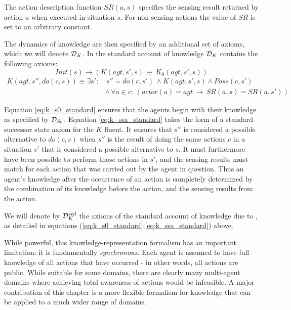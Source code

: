 The action description function $SR(a,s)$ specifies the sensing result
returned by action $a$ when executed in situation $s$. For non-sensing
actions the value of $SR$ is set to an arbitrary constant.

The dynamics of knowledge are then specified by an additional set
of axioms, which we will denote $\mathcal{D}_{K}$. In the standard account
of knowledge $\mathcal{D}_{K}$ contains the following axioms:\begin{equation}
Init(s)\rightarrow\left(K(agt,s',s)\,\equiv\, K_{0}(agt,s',s)\right)\label{eq:k_s0_standard}\end{equation}
 \begin{align}
K(agt,s'',do(c,s))\equiv\exists s': & \, s''=do(c,s')\,\wedge K(agt,s',s)\wedge Poss(c,s')\nonumber \\
 & \wedge\,\forall a\in c:\,\left(actor(a)=agt\,\rightarrow\, SR(a,s)=SR(a,s')\right)\label{eq:k_ssa_standard}\end{align}


Equation \eqref{eq:k_s0_standard} ensures that the agents begin with
their knowledge as specified by $\mathcal{D}_{S_{0}}$. Equation \eqref{eq:k_ssa_standard}
takes the form of a standard successor state axiom for the $K$ fluent.
It ensures that $s''$ is considered a possible alternative to $do(c,s)$
when $s''$ is the result of doing the same actions $c$ in a situation
$s'$ that is considered a possible alternative to $s$. It must furthermore
have been possible to perform those actions in $s'$, and the sensing
results must match for each action that was carried out by the agent
in question. Thus an agent's knowledge after the occurrence of an
action is completely determined by the combination of its knowledge
before the action, and the sensing results from the action.

\medskip{}


\begin{defn}
We will denote by $\mathcal{D}_{K}^{std}$ the axioms of the standard account
of knowledge due to \citet{scherl03sc_knowledge}, as detailed in
equations (\ref{eq:k_s0_standard},\ref{eq:k_ssa_standard}) above. 
\end{defn}
While powerful, this knowledge-representation formalism has an important
limitation: it is fundamentally \emph{synchronous.} Each agent is
assumed to have full knowledge of all actions that have occurred -
in other words, all actions are public. While suitable for some domains,
there are clearly many multi-agent domains where achieving total awareness
of actions would be infeasible. A major contribution of this chapter
is a more flexible formalism for knowledge that can be applied to
a much wider range of domains.

